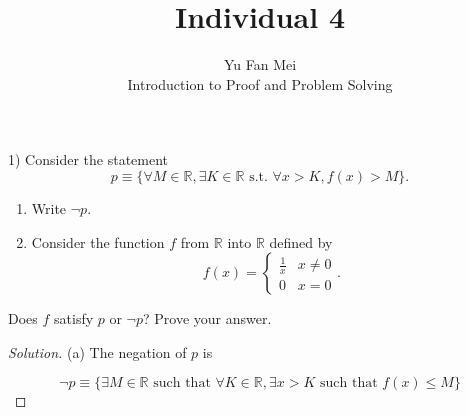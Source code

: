 \documentclass[12pt]{article}
\newenvironment{problem}[2][Problem]{\begin{trivlist}
\item[\hskip \labelsep {\bfseries #1}\hskip \labelsep {\bfseries #2.}]}{\end{trivlist}}
\newenvironment{solution}
               {\let\oldqedsymbol=\qedsymbol
                \renewcommand{\qedsymbol}{$\blacktriangleleft$}
                \begin{proof}[\textit\upshape Solution]}
               {\end{proof}
                \renewcommand{\qedsymbol}{\oldqedsymbol}}
\begin{document}

\title{Individual 4}%
\author{Yu Fan Mei\\ %
	Introduction to Proof and Problem Solving} %

\maketitle

\begin{problem}{12} %
    (1) Consider the statement
    $$p \equiv \{\forall M \in \mathbb{R}, \exists K \in \mathbb{R}\,\, \text{s.t.} \,\,\forall x > K,
    f(x) > M\}.$$
    \begin{enumerate}
    \item[(a)] Write $\neg p$.
    \item[(b)] Consider the function $f$ from $\mathbb{R}$ into $\mathbb{R}$ defined by
    $$f(x) = \begin{cases}
    \frac{1}{x} & x \neq 0\\
    0 & x = 0
    \end{cases}.$$
    \end{enumerate}
    Does $f$ satisfy $p$ or $\neg p$? Prove your answer.
    

\end{problem}

\begin{solution}

    (a) The negation of $p$ is

    $$\lnot p \equiv \{ \exists M \in \mathbb{R} \text{ such that } \forall K \in \mathbb{R}, \exists x > K \text{ such that } f(x) \leq M\}$$
\end{solution}
\end{document}

